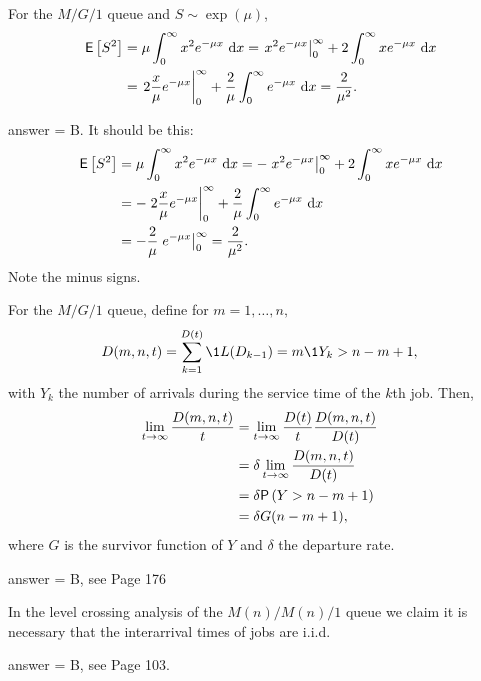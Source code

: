 \begin{exercise}[201804]
For the $M/G/1$ queue and $S\sim \exp(\mu)$,
    \begin{align*}
\,\mathsf{E}\left[S^2\right] 
&= \mu \int_0^\infty x^2 e^{- \mu x} \,\,\text{d}x = \left. x^2 e^{-\mu x} \right|_0^\infty + 2 \int_0^\infty x e^{-\mu x} \, \,\text{d}x \\
&= \left. 2\frac x \mu e^{-\mu x} \right|_0^\infty + \frac 2 \mu\int_0^\infty e^{-\mu x} \, \,\text{d}x =\frac2{\mu^2}.
    \end{align*}
\begin{solution}
answer = B.
It should be this:
    \begin{align*}
\,\mathsf{E}\left[S^2\right] 
&= \mu \int_0^\infty x^2 e^{- \mu x} \,\,\text{d}x = -\left. x^2 e^{-\mu x} \right|_0^\infty + 2 \int_0^\infty x e^{-\mu x} \, \,\text{d}x \\
&= -\left. 2\frac x \mu e^{-\mu x} \right|_0^\infty + \frac 2 \mu\int_0^\infty e^{-\mu x} \, \,\text{d}x \\
&= - \frac 2 \mu  \left. e^{-\mu x}\right|_0^\infty = \frac2{\mu^2}.
    \end{align*}
Note the minus signs.
\end{solution}
\end{exercise}

\begin{exercise}[201804]
For the $M/G/1$ queue, define for $m=1,\ldots, n,$
\begin{equation*}
  D(m, n, t) = \sum_{k=1}^{D(t)}\1{L(D_{k-1})=m}\1{Y_k>n-m+1},
\end{equation*}
with $Y_k$ the number of arrivals during the service time of the $k$th job. 
Then,
\begin{align*}
  \lim_{t\to\infty} \frac{  D(m, n, t)}t 
&=   \lim_{t\to\infty}  \frac{D(t)}t\frac{ D(m, n, t)}{D(t)} \\
&=   \delta \lim_{t\to\infty} \frac{ D(m, n, t)}{D(t)} \\
&=   \delta \P{Y>n-m+1}\\
& = \delta  G(n-m+1),
\end{align*}
where $G$ is the survivor function of $Y$ and $\delta$ the departure rate.
\begin{solution}
answer = B, see Page 176
\end{solution}
\end{exercise}



\begin{exercise}[201807]{1}
In the level crossing analysis of the $M(n)/M(n)/1$ queue we claim it is necessary that the interarrival times of jobs are i.i.d.
\begin{solution}
answer = B, see Page 103. 
\end{solution}
\end{exercise}

